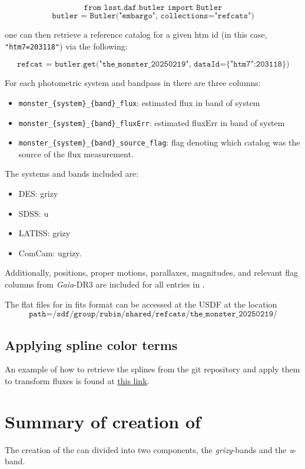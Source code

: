 $$\texttt{from lsst.daf.butler import Butler}$$
$$\texttt{butler = Butler("embargo", collections="refcats")}$$

one can then retrieve a reference catalog for a given htm id (in this case, \texttt{"htm7=203118"}) via the following:

$$\texttt{refcat = butler.get("the\_monster\_20250219", dataId=\{"htm7":203118\})}$$

For each photometric system and bandpass in \monster there are three columns:
\begin{itemize}
    \item \texttt{monster\_\{system\}\_\{band\}\_flux}: estimated flux in band of system
    \item \texttt{monster\_\{system\}\_\{band\}\_fluxErr}: estimated fluxErr in band of system
    \item \texttt{monster\_\{system\}\_\{band\}\_source\_flag}: flag denoting which catalog was the source of the flux measurement.
\end{itemize}

The systems and bands included are:
\begin{itemize}
    \item DES: grizy
    \item SDSS: u
    \item LATISS: grizy
    \item ComCam: ugrizy.
\end{itemize}

Additionally, positions, proper motions, parallaxes, magnitudes, and relevant flag columns from \emph{Gaia}-DR3 are included for all entries in \monster.

The flat files for \monster in fits format can be accessed at the USDF at the location
$$\texttt{path=/sdf/group/rubin/shared/refcats/the\_monster\_20250219/}$$

\subsection{Applying spline color terms}

An example of how to retrieve the splines from the git repository and apply them to transform fluxes is found at \href{https://github.com/lsst-dm/dmtn-277/blob/main/notebooks/apply_monster_transformations.ipynb}{this link}.

\section{Summary of creation of \monster}
\label{sec:summary}
The creation of the \monster can divided into two components, the \textit{grizy}-bands and the \textit{u}-band.



